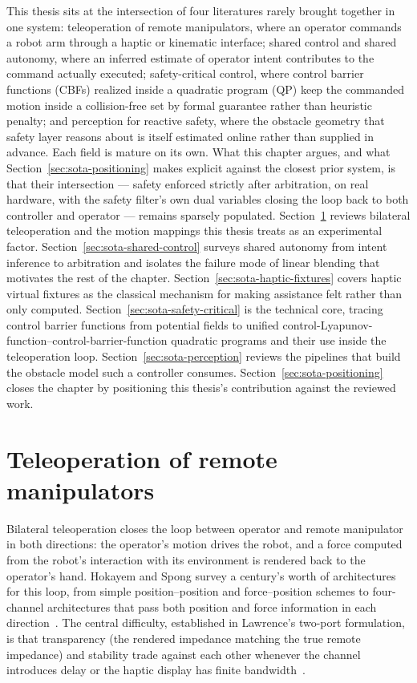 \documentclass[12pt,a4paper,twoside,openright]{report}
\begin{document}
This thesis sits at the intersection of four literatures rarely brought together in one system: teleoperation of remote manipulators, where an operator commands a robot arm through a haptic or kinematic interface; shared control and shared autonomy, where an inferred estimate of operator intent contributes to the command actually executed; safety-critical control, where control barrier functions (CBFs) realized inside a quadratic program (QP) keep the commanded motion inside a collision-free set by formal guarantee rather than heuristic penalty; and perception for reactive safety, where the obstacle geometry that safety layer reasons about is itself estimated online rather than supplied in advance. Each field is mature on its own. What this chapter argues, and what Section~\ref{sec:sota-positioning} makes explicit against the closest prior system, is that their intersection --- safety enforced strictly after arbitration, on real hardware, with the safety filter's own dual variables closing the loop back to both controller and operator --- remains sparsely populated. Section~\ref{sec:sota-teleoperation} reviews bilateral teleoperation and the motion mappings this thesis treats as an experimental factor. Section~\ref{sec:sota-shared-control} surveys shared autonomy from intent inference to arbitration and isolates the failure mode of linear blending that motivates the rest of the chapter. Section~\ref{sec:sota-haptic-fixtures} covers haptic virtual fixtures as the classical mechanism for making assistance felt rather than only computed. Section~\ref{sec:sota-safety-critical} is the technical core, tracing control barrier functions from potential fields to unified control-Lyapunov-function--control-barrier-function quadratic programs and their use inside the teleoperation loop. Section~\ref{sec:sota-perception} reviews the pipelines that build the obstacle model such a controller consumes. Section~\ref{sec:sota-positioning} closes the chapter by positioning this thesis's contribution against the reviewed work.

\section{Teleoperation of remote manipulators}
\label{sec:sota-teleoperation}

Bilateral teleoperation closes the loop between operator and remote manipulator in both directions: the operator's motion drives the robot, and a force computed from the robot's interaction with its environment is rendered back to the operator's hand. Hokayem and Spong survey a century's worth of architectures for this loop, from simple position--position and force--position schemes to four-channel architectures that pass both position and force information in each direction~\cite{hokayem2006bilateral}. The central difficulty, established in Lawrence's two-port formulation, is that transparency (the rendered impedance matching the true remote impedance) and stability trade against each other whenever the channel introduces delay or the haptic display has finite bandwidth~\cite{lawrence1993stability}.
\end{document}

